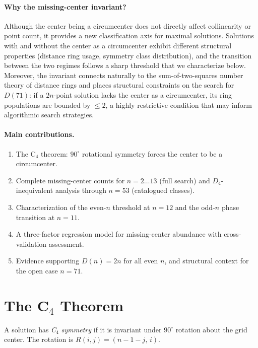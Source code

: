 \documentclass[11pt,a4paper]{article}
\theoremstyle{plain}
\theoremstyle{definition}
\begin{document}
\paragraph{Why the missing-center invariant?} Although the center being a circumcenter does not directly affect collinearity or point count, it provides a new classification axis for maximal solutions. Solutions with and without the center as a circumcenter exhibit different structural properties (distance ring usage, symmetry class distribution), and the transition between the two regimes follows a sharp threshold that we characterize below. Moreover, the invariant connects naturally to the sum-of-two-squares number theory of distance rings and places structural constraints on the search for $D(71)$: if a $2n$-point solution lacks the center as a circumcenter, its ring populations are bounded by $\le 2$, a highly restrictive condition that may inform algorithmic search strategies.

\paragraph{Main contributions.}
\begin{enumerate}[nosep]
\item The C$_4$ theorem: $90^\circ$ rotational symmetry forces the center to be a circumcenter.
\item Complete missing-center counts for $n=2\dots13$ (full search) and $D_4$-inequivalent analysis through $n=53$ (catalogued classes).
\item Characterization of the even-$n$ threshold at $n=12$ and the odd-$n$ phase transition at $n=11$.
\item A three-factor regression model for missing-center abundance with cross-validation assessment.
\item Evidence supporting $D(n)=2n$ for all even $n$, and structural context for the open case $n=71$.
\end{enumerate}


\section{The C$_4$ Theorem}
\label{sec:c4}

A solution has \emph{C$_4$ symmetry} if it is invariant under $90^\circ$ rotation about the grid center. The rotation is $R(i,j) = (n-1-j,\, i)$.
\end{document}
